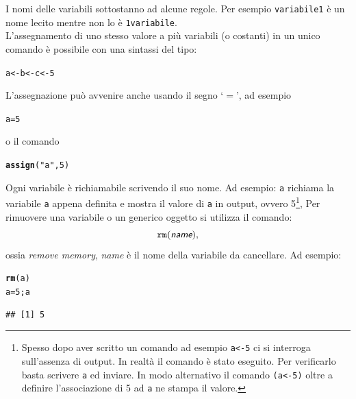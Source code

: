 \documentclass[onecolumn,11pt]{book}\usepackage[]{graphicx}\usepackage[]{color}
\makeatletter
\newcommand{\hlnum}[1]{\textcolor[rgb]{0.686,0.059,0.569}{#1}}%
\newcommand{\hlstr}[1]{\textcolor[rgb]{0.192,0.494,0.8}{#1}}%
\newcommand{\hlstd}[1]{\textcolor[rgb]{0.345,0.345,0.345}{#1}}%
\newcommand{\hlkwb}[1]{\textcolor[rgb]{0.69,0.353,0.396}{#1}}%
\newcommand{\hlkwd}[1]{\textcolor[rgb]{0.737,0.353,0.396}{\textbf{#1}}}%
\newenvironment{kframe}{%
 \def\at@end@of@kframe{}%
 \ifinner\ifhmode%
  \def\at@end@of@kframe{\end{minipage}}%
  \begin{minipage}{\columnwidth}%
 \fi\fi%
 \def\FrameCommand##1{\hskip\@totalleftmargin \hskip-\fboxsep
 \colorbox{shadecolor}{##1}\hskip-\fboxsep
     \hskip-\linewidth \hskip-\@totalleftmargin \hskip\columnwidth}%
 \MakeFramed {\advance\hsize-\width
   \@totalleftmargin\z@ \linewidth\hsize
   \@setminipage}}%
 {\par\unskip\endMakeFramed%
 \at@end@of@kframe}
\newenvironment{knitrout}{}{} %
\newcommand{\varia}[1]{\textsl{\textsf{#1}}}
\makeatother
\begin{document}
I nomi delle variabili sottostanno ad alcune regole. Per esempio \texttt{variabile1} \`e un nome lecito mentre non lo \`e  \texttt{1variabile}.\\  L'assegnamento di uno stesso valore a pi\`u variabili (o costanti) in un unico comando \`e possibile con una sintassi del tipo:
\begin{knitrout}
\color{fgcolor}\begin{kframe}
\begin{alltt}
\hlstd{a}\hlkwb{<-}\hlstd{b}\hlkwb{<-}\hlstd{c}\hlkwb{<-}\hlnum{5}
\end{alltt}
\end{kframe}
\end{knitrout}
L'assegnazione pu\`o avvenire anche usando il segno `$=$', ad esempio
\begin{knitrout}
\color{fgcolor}\begin{kframe}
\begin{alltt}
\hlstd{a}\hlkwb{=}\hlnum{5}
\end{alltt}
\end{kframe}
\end{knitrout}
o il comando
\begin{knitrout}
\color{fgcolor}\begin{kframe}
\begin{alltt}
\hlkwd{assign}\hlstd{(}\hlstr{"a"}\hlstd{,}\hlnum{5}\hlstd{)}
\end{alltt}
\end{kframe}
\end{knitrout}
Ogni variabile \`e richiamabile scrivendo il suo nome.
Ad esempio:
\texttt{a} richiama la variabile \texttt{a} appena definita e mostra il valore di \texttt{a} in output, ovvero 5\footnote{Spesso
dopo aver scritto un comando ad esempio \texttt{a<-5} ci si interroga sull'assenza di output. In realt\`a il comando \`e stato eseguito. Per verificarlo basta scrivere \texttt{a} ed inviare. In modo alternativo il comando  \texttt{(a<-5)} oltre a definire l'associazione di 5 ad \texttt{a} ne stampa il valore.},
Per rimuovere una variabile o un generico oggetto si utilizza il comando:
$$\texttt{rm}(\varia{name}),$$
 ossia {\it remove memory}, \varia{name} \`e il nome della variabile da cancellare. Ad  esempio:
\begin{knitrout}
\color{fgcolor}\begin{kframe}
\begin{alltt}
\hlkwd{rm}\hlstd{(a)}
\hlstd{a}\hlkwb{=}\hlnum{5}\hlstd{;a}
\end{alltt}
\begin{verbatim}
## [1] 5
\end{verbatim}
\end{kframe}
\end{knitrout}
\end{document}
